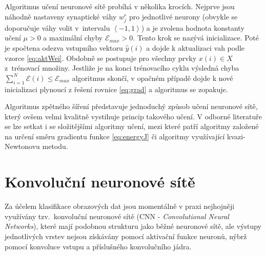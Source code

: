 {\par{Algoritmus učení neuronové sítě probíhá v několika krocích. Nejprve jsou náhodně
nastaveny synaptické váhy $w_j^r$ pro jednotlivé neurony (obvykle se doporučuje váhy volit
v~intervalu $\left\langle-1,1\right\rangle$) a je zvolena hodnota konstanty učení $\mu>0$ a maximální chyby $\mathcal{E}_{max}>0$. Tento krok se nazývá inicializace. Poté je spočtena odezva vstupního vektoru $\hat{y}\left(i\right)$ a dojde k aktualizaci vah podle vzorce \ref{eq:aktWei}. Obdobně se postupuje pro všechny prvky $x\left(i\right)\in X$ z~trénovací množiny. Jestliže je na konci trénovacího cyklu výsledná chyba $\sum_{i=1}^N\mathcal{E}\left(i\right)\leq\mathcal{E}_{max}$ algoritmus skončí, v opačném případě dojde k nové inicializaci plynoucí z řešení rovnice \ref{eq:grad} a algoritmus se zopakuje.}

\par{Algoritmus zpětného šíření představuje jednoduchý způsob učení neuronové sítě,
který ovšem velmi kvalitně vystihuje princip takového učení. V odborné literatuře 
se lze setkat i se složitějšími algoritmy učení, mezi které patří algoritmy založené
na určení směru gradientu funkce \ref{eq:energyJ} či algoritmy využívající kvazi-Newtonovu metodu.}











\newpage









\section{Konvoluční neuronové sítě}
\par{Za účelem klasifikace obrazových dat jsou momentálně v praxi nejhojněji využívány tzv.~konvoluční neuronové sítě (CNN - \textit{Convolutional Neural Networks}), které mají podobnou strukturu jako běžné neuronové sítě, ale výstupy jednotlivých vrstev nejsou získávány pomocí aktivační funkce neuronů, nýbrž pomocí konvoluce vstupu a příslušného konvolučního jádra.}

}
